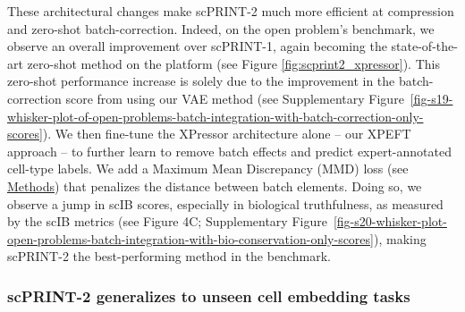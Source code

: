 These architectural changes make scPRINT-2 much more efficient at
compression and zero-shot batch-correction. Indeed, on the open
problem's benchmark, we observe an overall improvement over scPRINT-1,
again becoming the state-of-the-art zero-shot method on the platform
(see Figure \ref{fig:scprint2_xpressor}). This zero-shot performance increase is solely due to
the improvement in the batch-correction score from using our \gls{VAE} method
(see Supplementary Figure~\ref{fig-s19-whisker-plot-of-open-problems-batch-integration-with-batch-correction-only-scores}). We then fine-tune the XPressor architecture alone
-- our XPEFT approach -- to further learn to remove batch effects and
predict expert-annotated cell-type labels. We add a Maximum Mean
Discrepancy (MMD) loss (see \hyperref[fine-tuning-task]{Methods})
that penalizes the distance between batch
elements\citep{ouyangMaximumMeanDiscrepancy2022,zhangSingleCellDataAnalysis2019}. Doing so, we observe a jump in scIB
scores, especially in biological truthfulness, as measured by the scIB
metrics (see Figure 4C; Supplementary Figure~\ref{fig-s20-whisker-plot-open-problems-batch-integration-with-bio-conservation-only-scores}), making \gls{scPRINT}-2 the
best-performing method in the benchmark.

\subsubsection{scPRINT-2 generalizes to unseen cell embedding
tasks}\label{scprint-2-generalizes-to-unseen-cell-embedding-tasks}

